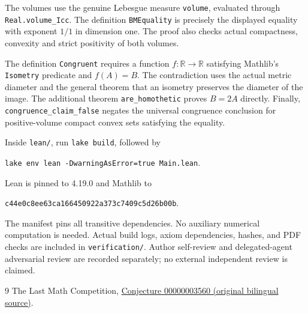 \documentclass[11pt]{article}
\begin{document}
The volumes use the genuine Lebesgue measure \texttt{volume}, evaluated through \texttt{Real.volume\_Icc}. The definition \texttt{BMEquality} is precisely the displayed equality with exponent $1/1$ in dimension one. The proof also checks actual compactness, convexity and strict positivity of both volumes.

The definition \texttt{Congruent} requires a function $f:\mathbb R\to\mathbb R$ satisfying Mathlib's \texttt{Isometry} predicate and $f(A)=B$. The contradiction uses the actual metric diameter and the general theorem that an isometry preserves the diameter of the image. The additional theorem \texttt{are\_homothetic} proves $B=2A$ directly. Finally, \texttt{congruence\_claim\_false} negates the universal congruence conclusion for positive-volume compact convex sets satisfying the equality.

Inside \texttt{lean/}, run \texttt{lake build}, followed by
\begin{center}\texttt{lake env lean -DwarningAsError=true Main.lean}.\end{center}
Lean is pinned to 4.19.0 and Mathlib to
\begin{center}\small\texttt{c44e0c8ee63ca166450922a373c7409c5d26b00b}.\end{center}
The manifest pins all transitive dependencies. No auxiliary numerical computation is needed. Actual build logs, axiom dependencies, hashes, and PDF checks are included in \texttt{verification/}. Author self-review and delegated-agent adversarial review are recorded separately; no external independent review is claimed.

\begin{thebibliography}{9}
 The Last Math Competition,
\href{https://github.com/The-Last-Math-Competition/The-Last-Math-Competition/blob/main/conjectures/00000003560.md}{Conjecture 00000003560 (original bilingual source)}.
\end{thebibliography}
\end{document}

